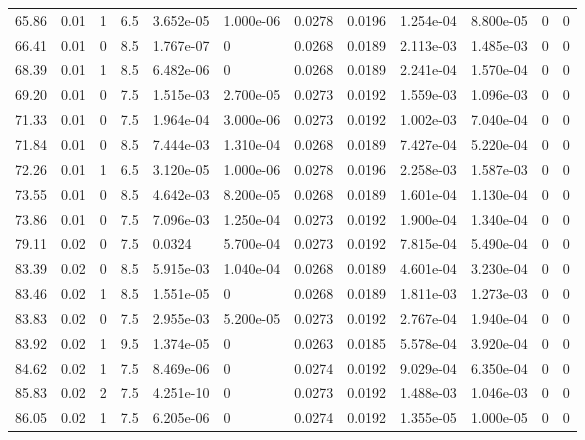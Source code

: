 \documentclass[preview]{standalone}
\begin{document}
{{{\begin{tabular}{L{1.2cm}C{1.2cm} C{0.3cm}C{0.5cm} C{1.4cm}C{1.4cm} C{1.4cm}C{1.4cm} C{1.6cm}C{1.6cm} C{1.6cm}C{1.6cm}}
  65.86  &  0.01  & 1     & 6.5 &  3.652e-05  & 1.000e-06  &  0.0278&   0.0196& 1.254e-04 & 8.800e-05   &  0 & 0  \\ 
  66.41  &  0.01  & 0     & 8.5 &  1.767e-07  & 0  &  0.0268&   0.0189& 2.113e-03 & 1.485e-03   &  0 & 0  \\ 
  68.39  &  0.01  & 1     & 8.5 &  6.482e-06  & 0  &  0.0268&   0.0189& 2.241e-04 & 1.570e-04   &  0 & 0  \\ 
  69.20  &  0.01  & 0     & 7.5 &  1.515e-03  & 2.700e-05  &  0.0273&   0.0192& 1.559e-03 & 1.096e-03   &  0 & 0  \\ 
  71.33  &  0.01  & 0     & 7.5 &  1.964e-04  & 3.000e-06  &  0.0273&   0.0192& 1.002e-03 & 7.040e-04   &  0 & 0  \\ 
  71.84  &  0.01  & 0     & 8.5 &  7.444e-03  & 1.310e-04  &  0.0268&   0.0189& 7.427e-04 & 5.220e-04   &  0 & 0  \\ 
  72.26  &  0.01  & 1     & 6.5 &  3.120e-05  & 1.000e-06  &  0.0278&   0.0196& 2.258e-03 & 1.587e-03   &  0 & 0  \\ 
  73.55  &  0.01  & 0     & 8.5 &  4.642e-03  & 8.200e-05  &  0.0268&   0.0189& 1.601e-04 & 1.130e-04   &  0 & 0  \\ 
  73.86  &  0.01  & 0     & 7.5 &  7.096e-03  & 1.250e-04  &  0.0273&   0.0192& 1.900e-04 & 1.340e-04   &  0 & 0  \\ 
  79.11  &  0.02  & 0     & 7.5 &  0.0324  & 5.700e-04  &  0.0273&   0.0192& 7.815e-04 & 5.490e-04   &  0 & 0  \\ 
  83.39  &  0.02  & 0     & 8.5 &  5.915e-03  & 1.040e-04  &  0.0268&   0.0189& 4.601e-04 & 3.230e-04   &  0 & 0  \\ 
  83.46  &  0.02  & 1     & 8.5 &  1.551e-05  & 0  &  0.0268&   0.0189& 1.811e-03 & 1.273e-03   &  0 & 0  \\ 
  83.83  &  0.02  & 0     & 7.5 &  2.955e-03  & 5.200e-05  &  0.0273&   0.0192& 2.767e-04 & 1.940e-04   &  0 & 0  \\ 
  83.92  &  0.02  & 1     & 9.5 &  1.374e-05  & 0  &  0.0263&   0.0185& 5.578e-04 & 3.920e-04   &  0 & 0  \\ 
  84.62  &  0.02  & 1     & 7.5 &  8.469e-06  & 0  &  0.0274&   0.0192& 9.029e-04 & 6.350e-04   &  0 & 0  \\ 
  85.83  &  0.02  & 2     & 7.5 &  4.251e-10  & 0  &  0.0273&   0.0192& 1.488e-03 & 1.046e-03   &  0 & 0  \\ 
  86.05  &  0.02  & 1     & 7.5 &  6.205e-06  & 0  &  0.0274&   0.0192& 1.355e-05 & 1.000e-05   &  0 & 0  \\ 

\end{tabular}}}}
\end{document}
